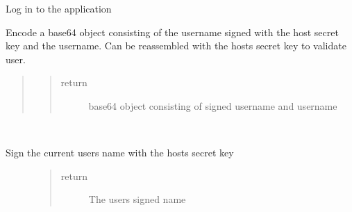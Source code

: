 \documentclass[letterpaper,10pt,english]{sphinxmanual}
\begin{document}
\begin{fulllineitems}
\begin{fulllineitems}
\end{fulllineitems}


\begin{fulllineitems}
\label{\detokenize{index:views.login.Login.login}}
Log in to the application

\end{fulllineitems}


\begin{fulllineitems}
\label{\detokenize{index:views.login.Login.rememberme}}
Encode a base64 object consisting of the username signed with the
host secret key and the username. Can be reassembled with the
hosts secret key to validate user.
\begin{quote}
\begin{quote}\begin{description}
\item[{return}] \leavevmode
base64 object consisting of signed username and username

\end{description}\end{quote}
\end{quote}

\end{fulllineitems}


\begin{fulllineitems}
\label{\detokenize{index:views.login.Login.sign_username}}~\begin{description}
\item[{Sign the current users name with the hosts secret key}] \leavevmode\begin{quote}\begin{description}
\item[{return}] \leavevmode
The users signed name

\end{description}\end{quote}

\end{description}

\end{fulllineitems}


\end{fulllineitems}
\end{document}
